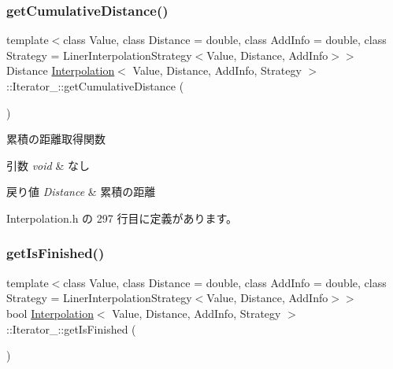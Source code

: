 \subsubsection{\texorpdfstring{get\+Cumulative\+Distance()}{getCumulativeDistance()}}
{\footnotesize\ttfamily template$<$class Value, class Distance = double, class Add\+Info = double, class Strategy = Liner\+Interpolation\+Strategy$<$\+Value, Distance, Add\+Info$>$$>$ \\
Distance \mbox{\hyperlink{class_interpolation}{Interpolation}}$<$ Value, Distance, Add\+Info, Strategy $>$\+::Iterator\+\_\+\+::get\+Cumulative\+Distance (\begin{DoxyParamCaption}{ }\end{DoxyParamCaption})\hspace{0.3cm}{\ttfamily [inline]}}



累積の距離取得関数 


\begin{DoxyParams}{引数}
{\em void} & なし \\
\hline
\end{DoxyParams}

\begin{DoxyRetVals}{戻り値}
{\em Distance} & 累積の距離 \\
\hline
\end{DoxyRetVals}


 Interpolation.\+h の 297 行目に定義があります。

\mbox{\label{class_interpolation_1_1_iterator___a05c51e62f7a2f97f8dc6fc3f1cff7b78}} 
\subsubsection{\texorpdfstring{get\+Is\+Finished()}{getIsFinished()}}
{\footnotesize\ttfamily template$<$class Value, class Distance = double, class Add\+Info = double, class Strategy = Liner\+Interpolation\+Strategy$<$\+Value, Distance, Add\+Info$>$$>$ \\
bool \mbox{\hyperlink{class_interpolation}{Interpolation}}$<$ Value, Distance, Add\+Info, Strategy $>$\+::Iterator\+\_\+\+::get\+Is\+Finished (\begin{DoxyParamCaption}{ }\end{DoxyParamCaption})\hspace{0.3cm}{\ttfamily [inline]}}



